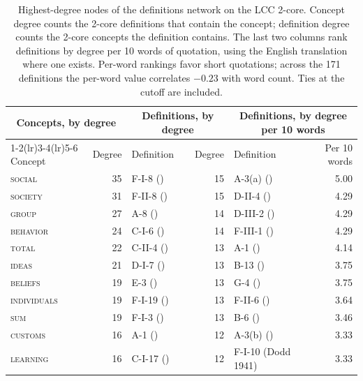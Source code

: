 \documentclass[11pt]{article}
\begin{document}
\begin{table}[t]
\centering
\caption{Highest-degree nodes of the definitions network on the LCC 2-core. Concept degree counts the 2-core definitions that contain the concept; definition degree counts the 2-core concepts the definition contains. The last two columns rank definitions by degree per 10 words of quotation, using the English translation where one exists. Per-word rankings favor short quotations; across the 171 definitions the per-word value correlates $-0.23$ with word count. Ties at the cutoff are included.}
\label{tab:top-degree}
\footnotesize
\setlength{\tabcolsep}{2.5pt}
\begin{tabular}{lrlrlr}
\toprule
\multicolumn{2}{c}{Concepts, by degree} & \multicolumn{2}{c}{Definitions, by degree} & \multicolumn{2}{c}{Definitions, by degree per 10 words} \\
\cmidrule(lr){1-2}\cmidrule(lr){3-4}\cmidrule(lr){5-6}
Concept & Degree & Definition & Degree & Definition & Per 10 words \\
\midrule
\textsc{social} & 35 & F-I-8 (\citealt{reuter1939}) & 15 & A-3(a) (\citealt{dixon1928}) & 5.00 \\
\textsc{society} & 31 & F-II-8 (\citealt{taylor1948}) & 15 & D-II-4 (\citealt{kluckhohn1942}) & 4.29 \\
\textsc{group} & 27 & A-8 (\citealt{hiller1933}) & 14 & D-III-2 (\citealt{young1934}) & 4.29 \\
\textsc{behavior} & 24 & C-I-6 (\citealt{gillin1942}) & 14 & F-III-1 (\citealt{bain1942}) & 4.29 \\
\textsc{total} & 22 & C-II-4 (\citealt{bidney1946}) & 13 & A-1 (\citealt{tylor1871}) & 4.14 \\
\textsc{ideas} & 21 & D-I-7 (\citealt{panunzio1939}) & 13 & B-13 (\citealt{grovesmoore1940}) & 3.75 \\
\textsc{beliefs} & 19 & E-3 (\citealt{ogburnnimkoff1940}) & 13 & G-4 (\citealt{rouse1939}) & 3.75 \\
\textsc{individuals} & 19 & F-I-19 (\citealt{murdock1949a}) & 13 & F-II-6 (\citealt{kluckhohnkelly1945a}) & 3.64 \\
\textsc{sum} & 19 & F-I-3 (\citealt{folsom1931}) & 13 & B-6 (\citealt{malinowski1931}) & 3.46 \\
\textsc{customs} & 16 & A-1 (\citealt{tylor1871}) & 12 & A-3(b) (\citealt{dixon1928}) & 3.33 \\
\textsc{learning} & 16 & C-I-17 (\citealt{frank1948}) & 12 & F-I-10 (Dodd 1941) & 3.33 \\

\end{tabular}
\end{table}
\end{document}
